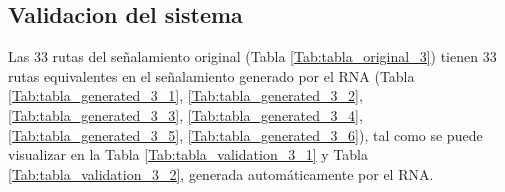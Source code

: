 \subsection{Validacion del sistema}

	Las 33 rutas del señalamiento original (Tabla \ref{Tab:tabla_original_3}) tienen 33 rutas equivalentes en el señalamiento generado por el RNA (Tabla \ref{Tab:tabla_generated_3_1}, \ref{Tab:tabla_generated_3_2}, \ref{Tab:tabla_generated_3_3}, \ref{Tab:tabla_generated_3_4}, \ref{Tab:tabla_generated_3_5}, \ref{Tab:tabla_generated_3_6}), tal como se puede visualizar en la Tabla \ref{Tab:tabla_validation_3_1} y Tabla \ref{Tab:tabla_validation_3_2}, generada automáticamente por el RNA.

    \begin{table}[H]
        {
        \caption{Equivalencias entre las rutas originales y las generadas por el RNA (Rutas 1 a 16).}
        \label{Tab:tabla_validation_3_1}
        \centering
            \begin{center}
\end{center}}
\end{table}
